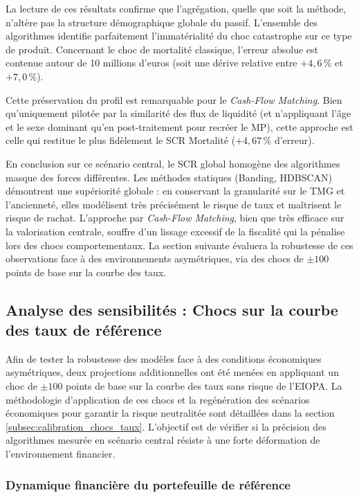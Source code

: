 La lecture de ces résultats confirme que l'agrégation, quelle que soit la méthode, n'altère pas la structure démographique globale du passif. L'ensemble des algorithmes identifie parfaitement l'immatérialité du choc catastrophe sur ce type de produit. Concernant le choc de mortalité classique, l'erreur absolue est contenue autour de 10 millions d'euros (soit une dérive relative entre $+4{,}6\,\%$ et $+7{,}0\,\%$). 

Cette préservation du profil est remarquable pour le \textit{Cash-Flow Matching}. Bien qu'uniquement pilotée par la similarité des flux de liquidité (et n'appliquant l'âge et le sexe dominant qu'en post-traitement pour recréer le MP), cette approche est celle qui restitue le plus fidèlement le SCR Mortalité ($+4{,}67\,\%$ d'erreur).

En conclusion sur ce scénario central, le SCR global homogène des algorithmes masque des forces différentes. Les méthodes statiques (Banding, HDBSCAN) démontrent une supériorité globale : en conservant la granularité sur le TMG et l'ancienneté, elles modélisent très précisément le risque de taux et maîtrisent le risque de rachat. L'approche par \textit{Cash-Flow Matching}, bien que très efficace sur la valorisation centrale, souffre d'un lissage excessif de la fiscalité qui la pénalise lors des chocs comportementaux. La section suivante évaluera la robustesse de ces observations face à des environnements asymétriques, via des chocs de $\pm 100$ points de base sur la courbe des taux.

\subsection{Analyse des sensibilités : Chocs sur la courbe des taux de référence}

Afin de tester la robustesse des modèles face à des conditions économiques asymétriques, deux projections additionnelles ont été menées en appliquant un choc de $\pm 100$ points de base sur la courbe des taux sans risque de l'EIOPA. La méthodologie d'application de ces chocs et la regénération des scénarios économiques pour garantir la risque neutralitée sont détaillées dans la section \ref{subsec:calibration_chocs_taux}. L'objectif est de vérifier si la précision des algorithmes mesurée en scénario central résiste à une forte déformation de l'environnement financier.

\subsubsection{Dynamique financière du portefeuille de référence}

